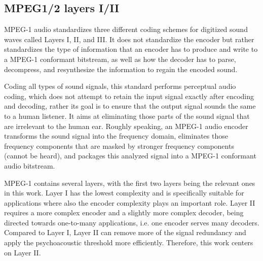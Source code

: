

\subsection{MPEG1/2 layers I/II}

MPEG-1 audio standardizes three different coding schemes for digitized sound waves called Layers I, II, and III. It does not standardize the encoder but rather standardizes the type of information that an encoder has to produce and write to a MPEG-1 conformant bitstream, as well as how the decoder has to parse, decompress, and resynthesize the information to regain the encoded sound.

Coding all types of sound signals, this standard performs perceptual audio coding, which does not attempt to retain the input signal exactly after encoding and decoding, rather its goal is to ensure that the output signal sounds the same to a human listener. It aims at eliminating those parts of the sound signal that are irrelevant to the human ear. Roughly speaking, an MPEG-1 audio encoder transforms the sound signal into the frequency domain, eliminates those frequency components that are masked by stronger frequency components (cannot be heard), and packages this analyzed signal into a MPEG-1 conformant audio bitstream.

MPEG-1 contains several layers, with the first two layers being the relevant ones in this work.
Layer I has the lowest complexity and is specifically suitable for applications where also the encoder complexity plays an important role.
Layer II requires a more complex encoder and a slightly more complex decoder, being directed towards one-to-many applications, i.e. one encoder serves many decoders. Compared to Layer I, Layer II can remove more of the signal redundancy and apply the psychoacoustic threshold more efficiently. Therefore, this work centers on Layer II.


